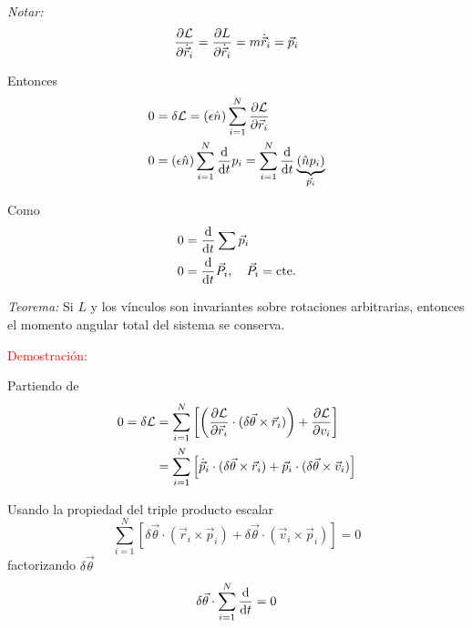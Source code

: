 \documentclass[../main]{subfiles}
\begin{document}
\textit{Notar:}
\begin{equation}
    \pdv{\mathcal{L}}{\dot{\vec{r}}_i}=\pdv{L}{\dot{\vec{r}}_i}=m\dot{\vec{r}}_i=\vec{p}_i
\end{equation}

Entonces 
\begin{equation}
    \begin{split}
        0&=\delta \mathcal{L}=(\epsilon\hat{n})\sum_{i=1}^N \pdv{\mathcal{L}}{\vec{r}_i}\\
        0&=(\epsilon\hat{n})\sum_{i=1}^N \dv{}{t}p_i=\sum_{i=1}^N \dv{}{t}\underbrace{(\hat{n}p_i)}_{\vec{p}_i}
    \end{split}
\end{equation}

Como
\begin{equation}
    \begin{split}
        0&=\dv{}{t}\sum \vec{p}_i \\
        0&=\dv{}{t}\vec{P}_i,\quad \vec{P}_i=\text{cte.}
    \end{split}
\end{equation}

\textit{Teorema:} Si $L$ y los vínculos son invariantes sobre rotaciones arbitrarias, entonces el momento angular  total del sistema se conserva.

\textcolor{red}{Demostración:}

Partiendo de 
\begin{equation}
    \begin{split}
        0=\delta \mathcal{L}&=\sum_{i=1}^N\left[\left(\pdv{\mathcal{L}}{\vec{r}_i}\cdot(\delta \vec{\theta} \times \vec{r}_i)\right)+\pdv{\mathcal{L}}{v_i}(\delta \vec{\theta} \times \vec{v}_i)\right]\\
        &=\sum_{i=1}^N \left[\dot{\vec{p}}_i \cdot (\delta \vec{\theta}\times\vec{r}_i)+\vec{p}_i\cdot(\delta\vec{\theta}\times\vec{v}_i)\right]
    \end{split}
\end{equation}

Usando la propiedad del triple producto escalar
\begin{equation}
    \sum_{i=1}^N \left[\delta \vec{\theta}\cdot(\vec{r}_i \times \vec{p}_i)+\delta\vec{\theta}\cdot(\vec{v}_i\times \vec{p}_i)\right]=0
\end{equation}
factorizando $\delta \vec{\theta}$
\begin{equation}
    \delta \vec{\theta}\cdot \sum_{i=1}^N \dv{}{t}(\vec{r}_i\times \vec{p}_i)=0
\end{equation}
\end{document}

